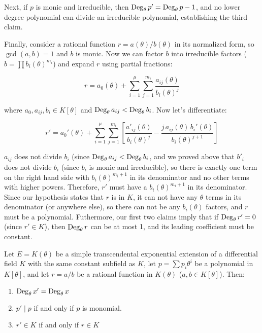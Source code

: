 Next, if $p$ is monic and irreducible, then ${\rm Deg}_\theta\, p' =
{\rm Deg}_\theta\, p - 1$, and no lower degree polynomial can divide
an irreducible polynomial, establishing the third claim.

Finally, consider a rational function $r=a(\theta)/b(\theta)$ in its
normalized form, so $\gcd(a,b) = 1$ and $b$ is monic.  Now we can
factor $b$ into irreducible factors ($b=\prod b_i(\theta)^{m_i}$)
and expand $r$ using partial fractions:

$$r = a_0(\theta) + \sum_{i=1}^\mu \sum_{j=1}^{m_i} \frac{a_{ij}(\theta)}{b_i(\theta)^j}$$

where $a_0, a_{ij}, b_i \in K[\theta]$ and ${\rm Deg}_\theta\, a_{ij} < {\rm
Deg}_\theta\, b_i$.  Now let's differentiate:

$$r' = a_0'(\theta) + \sum_{i=1}^\mu \sum_{j=1}^{m_i} \left[
\frac{a'_{ij}(\theta)}{b_i(\theta)^j} - \frac{j\, a_{ij}(\theta)\,
b_i'(\theta)}{b_i(\theta)^{j+1}} \right]$$

$a_{ij}$ does not divide $b_i$ (since ${\rm Deg}_\theta\, a_{ij} <
{\rm Deg}_\theta\, b_i$, and we proved above that $b'_i$ does not
divide $b_i$ (since $b_i$ is monic and irreducible), so there is
exactly one term on the right hand side with $b_i(\theta)^{m_i + 1}$
in its denominator and no other terms with higher powers.  Therefore,
$r'$ must have a $b_i(\theta)^{m_i +1}$ in its denominator.  Since our
hypothesis states that $r$ is in $K$, it can not have any $\theta$
terms in its denominator (or anywhere else), so there can not be any
$b_i(\theta)$ factors, and $r$ must be a polynomial.  Futhermore, our
first two claims imply that if ${\rm Deg}_\theta\, r' = 0$ (since
$r'\in K$), then ${\rm Deg}_\theta\, r$ can be at most 1, and its
leading coefficient must be constant.

\endtheorem

\theorem\label{basic exponential properties}
Let $E=K(\theta)$ be a simple transcendental exponential extension of
a differential field $K$ with the same constant subfield as $K$,
let $p=\sum p_i \theta^i$ be a polynomial in $K[\theta]$,
and let $r=a/b$ be a rational function in $K(\theta)$
($a, b \in K[\theta]$).  Then:

\begin{enumerate}
\item ${\rm Deg}_\theta\, x' = {\rm Deg}_\theta\, x$
\item $p' \mid p$ if and only if $p$ is monomial.
\item $r' \in K$ if and only if $r \in K$
\end{enumerate}

